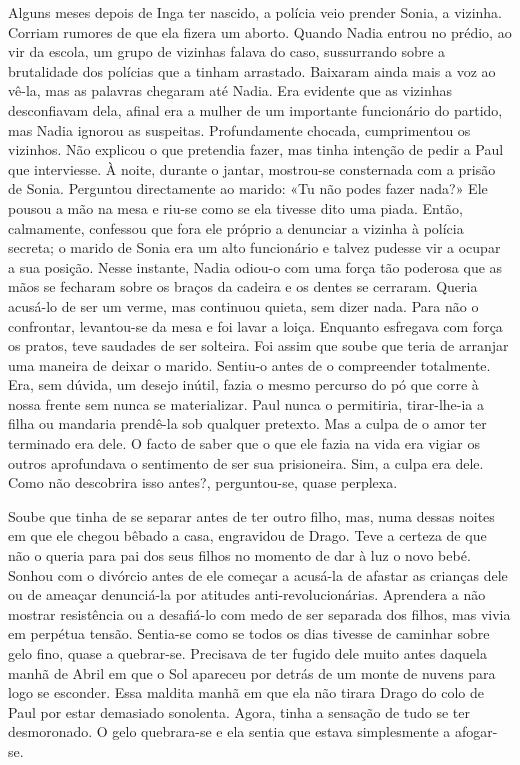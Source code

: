 Alguns meses depois de Inga ter nascido, a polícia veio prender Sonia, a
vizinha. Corriam rumores de que ela fizera um aborto. Quando Nadia
entrou no prédio, ao vir da escola, um grupo de vizinhas falava do caso,
sussurrando sobre a brutalidade dos polícias que a tinham arrastado.
Baixaram ainda mais a voz ao vê-la, mas as palavras chegaram até
Nadia. Era evidente que as vizinhas desconfiavam dela, afinal era a
mulher de um importante funcionário do partido, mas Nadia ignorou as
suspeitas. Profundamente chocada, cumprimentou os vizinhos. Não
explicou o que pretendia fazer, mas tinha intenção de pedir a Paul que
interviesse. À noite, durante o jantar, mostrou-se consternada com a
prisão de Sonia. Perguntou directamente ao marido: «Tu não podes fazer
nada?» Ele pousou a mão na mesa e riu-se como se ela tivesse dito uma
piada. Então, calmamente, confessou que fora ele próprio a denunciar a
vizinha à polícia secreta; o marido de Sonia era um alto funcionário e
talvez pudesse vir a ocupar a sua posição. Nesse instante, Nadia odiou-o
com uma força tão poderosa que as mãos se fecharam sobre os braços da
cadeira e os dentes se cerraram. Queria acusá-lo de ser um verme, mas
continuou quieta, sem dizer nada. Para não o confrontar, levantou-se da
mesa e foi lavar a loiça. Enquanto esfregava com força os pratos, teve
saudades de ser solteira. Foi assim que soube que teria de arranjar uma
maneira de deixar o marido. Sentiu-o antes de o compreender totalmente.
Era, sem dúvida, um desejo inútil, fazia o mesmo percurso do pó que
corre à nossa frente sem nunca se materializar. Paul nunca o permitiria,
tirar-lhe-ia a filha ou mandaria prendê-la sob qualquer pretexto. Mas a culpa de o amor ter terminado era
dele. O facto de saber que o que ele fazia na vida era vigiar os outros
aprofundava o sentimento de ser sua prisioneira. Sim, a culpa era dele.
Como não descobrira isso antes?, perguntou-se, quase perplexa.

Soube que tinha de se separar antes de ter outro filho, mas, numa dessas
noites em que ele chegou bêbado a casa, engravidou de Drago. Teve a
certeza de que não o queria para pai dos seus filhos no momento de dar à
luz o novo bebé. Sonhou com o divórcio antes de ele começar a acusá-la de afastar as crianças dele ou de ameaçar denunciá-la por atitudes
anti-revolucionárias. Aprendera a não mostrar resistência ou a
desafiá-lo com medo de ser separada dos filhos, mas vivia em perpétua
tensão. Sentia-se como se todos os dias tivesse de caminhar sobre gelo
fino, quase a quebrar-se. Precisava de ter fugido dele muito antes
daquela manhã de Abril em que o Sol apareceu por detrás de um monte de
nuvens para logo se esconder. Essa maldita manhã em que ela não tirara
Drago do colo de Paul por estar demasiado sonolenta. Agora, tinha a
sensação de tudo se ter desmoronado. O gelo quebrara-se e ela sentia que
estava simplesmente a afogar-se.


